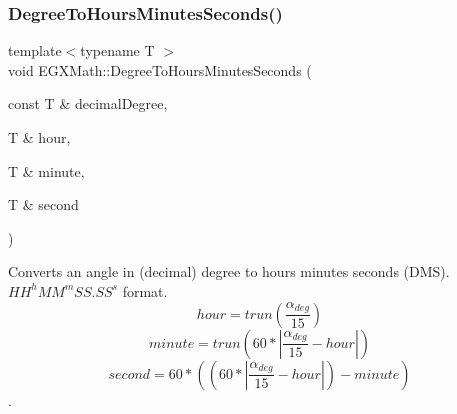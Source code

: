 \mbox{\label{group___e_g_x_math-_angle_conversions-_degree_ga770b13da33b6f6c7bfa398cca7f24dbe}} 
\subsubsection{\texorpdfstring{Degree\+To\+Hours\+Minutes\+Seconds()}{DegreeToHoursMinutesSeconds()}}
{\footnotesize\ttfamily template$<$typename T $>$ \\
void E\+G\+X\+Math\+::\+Degree\+To\+Hours\+Minutes\+Seconds (\begin{DoxyParamCaption}\item[{const T \&}]{decimal\+Degree,  }\item[{T \&}]{hour,  }\item[{T \&}]{minute,  }\item[{T \&}]{second }\end{DoxyParamCaption})}



Converts an angle in (decimal) degree to hours minutes seconds (D\+MS). ${HH}^{h}{MM}^{m}{SS.SS}^{s}$ format. \[hour=trun(\frac{\alpha_{deg}}{15})\] \[minute=trun(60 * |\frac{\alpha_{deg}}{15} - hour|)\] \[second=60 * ((60 * |\frac{\alpha_{deg}}{15} - hour|)-minute)\]. 

